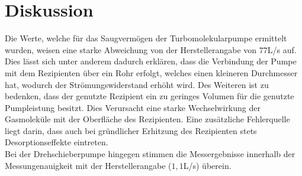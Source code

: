 \section{Diskussion}
Die Werte, welche für das Saugvermögen der Turbomolekularpumpe ermittelt wurden, weisen eine starke Abweichung von der Herstellerangabe von $77$\si{\liter}/\si{\second} auf. Dies lässt
sich unter anderem dadurch erklären, dass die Verbindung der Pumpe mit dem Rezipienten über ein Rohr erfolgt, welches einen kleineren Durchmesser hat, wodurch der Strömungswiderstand erhöht wird.
Des Weiteren ist zu bedenken, dass der genutzte Rezipient ein zu geringes Volumen für die genutzte Pumpleistung besitzt. Dies Verursacht eine starke Wechselwirkung der Gasmoleküle mit der Oberfläche des Rezipienten. Eine zusätzliche Fehlerquelle liegt darin, dass
auch bei gründlicher Erhitzung des Rezipienten stets Desorptionseffekte eintreten.\\
Bei der Drehschieberpumpe hingegen stimmen die Messergebnisse innerhalb der Messungenauigkeit mit der Herstellerangabe ($1,1$\si{\liter}/\si{\second}) überein.
